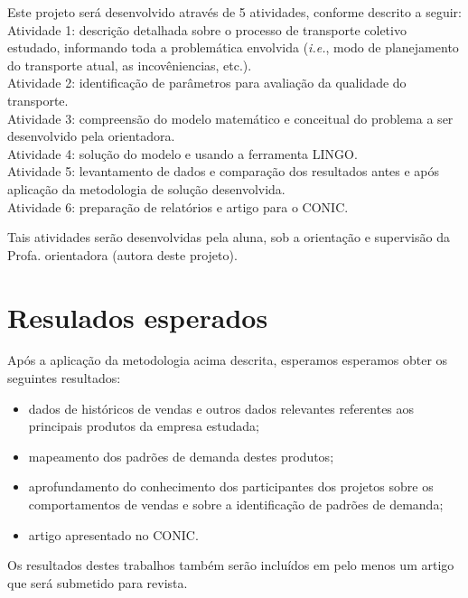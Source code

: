 \documentclass[11pt,a4paper]{article}
\begin{document}
Este projeto será desenvolvido através de 5 atividades, conforme descrito a seguir:\\

Atividade 1: descrição detalhada sobre o processo de transporte coletivo estudado, informando toda a problemática envolvida (\emph{i.e.}, modo de planejamento do transporte atual, as incovêniencias, etc.).\\

Atividade 2: identificação de parâmetros para avaliação da qualidade do transporte.\\

Atividade 3: compreensão do modelo matemático e conceitual do problema a ser desenvolvido pela orientadora.\\

Atividade 4: solução do modelo e usando a ferramenta LINGO.\\

Atividade 5: levantamento de dados e comparação dos resultados antes e após aplicação da metodologia de solução desenvolvida.\\

Atividade 6: preparação de relatórios e artigo para o CONIC.

Tais atividades serão desenvolvidas pela aluna, sob a orientação e supervisão da Profa. orientadora (autora deste projeto).

\section{Resulados esperados}

Após a aplicação da metodologia acima descrita, esperamos esperamos obter os seguintes resultados: 

\begin{itemize}
    \item dados de históricos de vendas e outros dados relevantes referentes aos principais produtos da empresa estudada;
    \item mapeamento dos padrões de demanda destes produtos;
    \item aprofundamento do conhecimento dos participantes dos projetos sobre os comportamentos de vendas e sobre a identificação de padrões de demanda;
    \item artigo apresentado no CONIC.
\end{itemize}

Os resultados destes trabalhos também serão incluídos em pelo menos um artigo que será submetido para revista.
\end{document}

